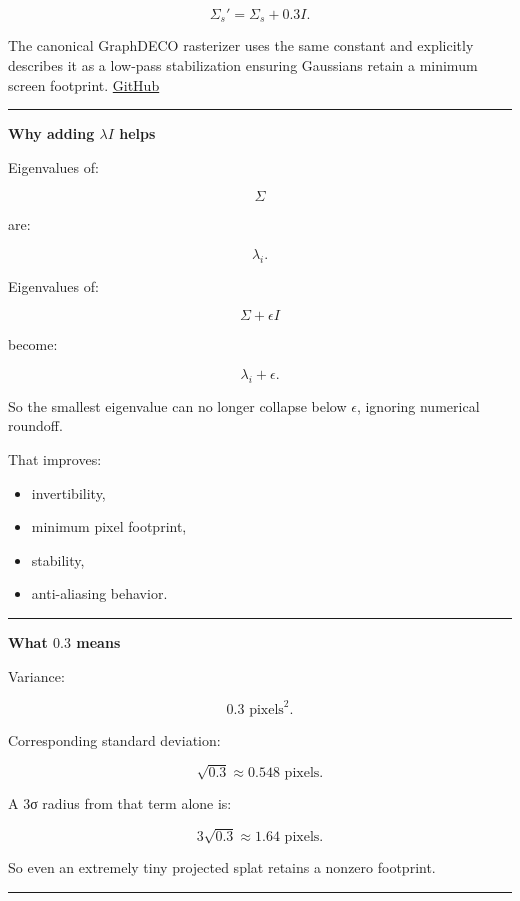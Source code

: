 \[
\boxed{
\Sigma_s'
=
\Sigma_s
+
0.3I.
}
\]

The canonical GraphDECO rasterizer uses the same constant and explicitly describes it as a low-pass stabilization ensuring Gaussians retain a minimum screen footprint. \href{https://github.com/graphdeco-inria/diff-gaussian-rasterization/blob/main/cuda_rasterizer/forward.cu?utm_source=chatgpt.com}{GitHub}

\begin{center}\rule{0.5\linewidth}{0.5pt}\end{center}

\textbf{Why adding \(\lambda I\) helps}

Eigenvalues of:

\[
\Sigma
\]

are:

\[
\lambda_i.
\]

Eigenvalues of:

\[
\Sigma+\epsilon I
\]

become:

\[
\lambda_i+\epsilon.
\]

So the smallest eigenvalue can no longer collapse below \(\epsilon\), ignoring numerical roundoff.

That improves:

\begin{itemize}
\tightlist
\item
  invertibility,
\item
  minimum pixel footprint,
\item
  stability,
\item
  anti-aliasing behavior.
\end{itemize}

\begin{center}\rule{0.5\linewidth}{0.5pt}\end{center}

\textbf{What \(0.3\) means}

Variance:

\[
0.3\text{ pixels}^2.
\]

Corresponding standard deviation:

\[
\sqrt{0.3}
\approx0.548\text{ pixels}.
\]

A 3σ radius from that term alone is:

\[
3\sqrt{0.3}
\approx1.64\text{ pixels}.
\]

So even an extremely tiny projected splat retains a nonzero footprint.

\begin{center}\rule{0.5\linewidth}{0.5pt}\end{center}

